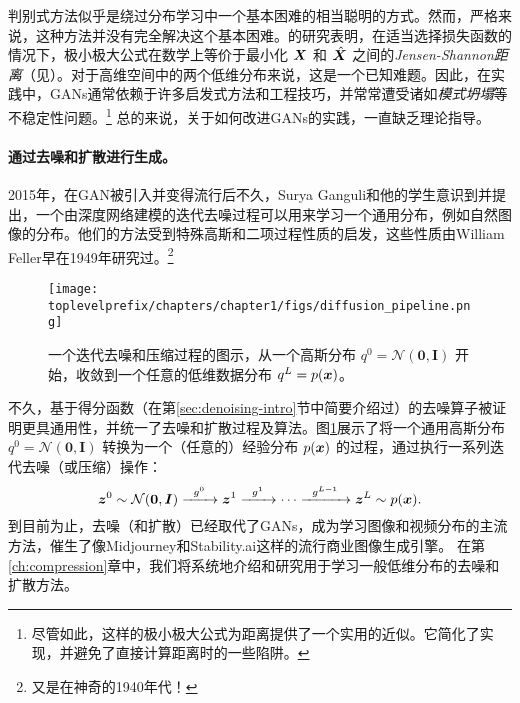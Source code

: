 \documentclass[../../book-main.tex]{subfiles}
\begin{document}
判别式方法似乎是绕过分布学习中一个基本困难的相当聪明的方式。然而，严格来说，这种方法并没有完全解决这个基本困难。\cite{Goodfellow-2014}的研究表明，在适当选择损失函数的情况下，极小极大公式在数学上等价于最小化 $\bm{X}$ 和 $\hat {\bm{X}}$ 之间的{\em Jensen-Shannon距离}（见\cite{Cover-Thomas}）。对于高维空间中的两个低维分布来说，这是一个已知难题。因此，在实践中，GANs通常依赖于许多启发式方法和工程技巧，并常常遭受诸如{\em 模式坍塌}等不稳定性问题。\footnote{尽管如此，这样的极小极大公式为距离提供了一个实用的近似。它简化了实现，并避免了直接计算距离时的一些陷阱。} 总的来说，关于如何改进GANs的实践，一直缺乏理论指导。

\paragraph{通过去噪和扩散进行生成。}
2015年，在GAN被引入并变得流行后不久，Surya Ganguli和他的学生意识到并提出，一个由深度网络建模的迭代去噪过程可以用来学习一个通用分布，例如自然图像的分布\cite{Sohl-Dickstein2015}。他们的方法受到特殊高斯和二项过程性质的启发，这些性质由William Feller早在1949年研究过\cite{Feller1949OnTT}。\footnote{又是在神奇的1940年代！}
\begin{figure}[t]
    \centering
    \texttt{[image: \\toplevelprefix/chapters/chapter1/figs/diffusion\_pipeline.png]}
    \caption{一个迭代去噪和压缩过程的图示，从一个高斯分布 $q^0 = \mathcal{N}(\boldsymbol{0}, \boldsymbol{I})$ 开始，收敛到一个任意的低维数据分布 $q^L = p(\bm{x})$。}
    \label{fig:diffusion}
\end{figure}

不久，基于得分函数\cite{hyvarinen05a}（在第\ref{sec:denoising-intro}节中简要介绍过）的去噪算子被证明更具通用性，并统一了去噪和扩散过程及算法\cite{song2019,song2020score,ho2020denoising}。图\ref{fig:diffusion}展示了将一个通用高斯分布 $q^0 = \mathcal{N}(\boldsymbol{0}, \boldsymbol{I})$ 转换为一个（任意的）经验分布 $p(\bm{x})$ 的过程，通过执行一系列迭代去噪（或压缩）操作：
\begin{equation}
        \bm{z}^0 \sim  \mathcal{N}(\boldsymbol{0}, \boldsymbol{I})\xrightarrow{\hspace{2mm} g^0  \hspace{2mm}} \bm{z}^1 \xrightarrow{\hspace{2mm} g^1 \hspace{2mm}} \cdots \xrightarrow{\hspace{2mm} g^{L-1}  \hspace{2mm}} \bm{z}^L \sim p(\bm{x}).
\end{equation}
到目前为止，去噪（和扩散）已经取代了GANs，成为学习图像和视频分布的主流方法，催生了像Midjourney和Stability.ai这样的流行商业图像生成引擎。
在第\ref{ch:compression}章中，我们将系统地介绍和研究用于学习一般低维分布的去噪和扩散方法。
\end{document}
